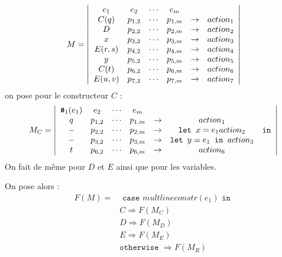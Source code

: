 \documentclass{cours}
\begin{document}
\[
    M = \left|\begin{array}{cccccc}
            e_{1}   & e_{2}    & \cdots & e_{m}    &             &            \\
            C(q)    & p_{1, 2} & \cdots & p_{1, m} & \rightarrow & action_{1} \\
            D       & p_{2, 2} & \cdots & p_{2, m} & \rightarrow & action_{2} \\
            x       & p_{3, 2} & \cdots & p_{3, m} & \rightarrow & action_{3} \\
            E(r, s) & p_{4, 2} & \cdots & p_{4, m} & \rightarrow & action_{4} \\
            y       & p_{5, 2} & \cdots & p_{5, m} & \rightarrow & action_{5} \\
            C(t)    & p_{6, 2} & \cdots & p_{6, m} & \rightarrow & action_{6} \\
            E(u, v) & p_{7, 2} & \cdots & p_{7, m} & \rightarrow & action_{7} \\
        \end{array}\right|
\]
on pose pour le constructeur $C$ :
\[
    M_{C} = \left|\begin{array}{cccccc}
            \texttt{\#}_{1}(e_{1}) & e_{2}    & \cdots & e_{m}    &             &                               \\
            q                      & p_{1, 2} & \cdots & p_{1, m} & \rightarrow & action_{1}                    \\
            -                      & p_{2, 2} & \cdots & p_{2, m} & \rightarrow & \texttt{let } x = e_{1}{action_{2}}  \\
            -                      & p_{3, 2} & \cdots & p_{3, m} & \rightarrow & \texttt{let } y = e_{1} \texttt{ in }{action_{3}} \\
            t                      & p_{6, 2} & \cdots & p_{6, m} & \rightarrow & action_{6}                    \\
        \end{array} \texttt{ in }\right|
\]
On fait de même pour $D$ et $E$ ainsi que pour les variables.

On pose alors :
\[
    \begin{split}
        F(M) = &\texttt{ case } multlineconstr(e_{1}) \texttt{ in }\\
        &C \Rightarrow F(M_{C})\\
        &D \Rightarrow F(M_{D})\\
        &E \Rightarrow F(M_{E})\\
        &\texttt{otherwise } \Rightarrow F(M_{R})
    \end{split}
\]
\end{document}
